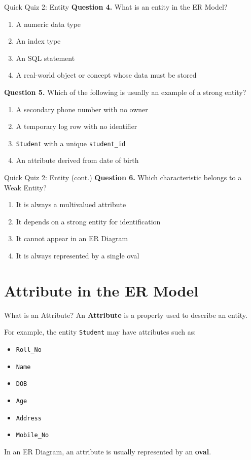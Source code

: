 \documentclass[aspectratio=169,11pt]{beamer}
\newcommand{\keyword}[1]{\textcolor{accent}{\textbf{#1}}}
\newcommand{\kw}[1]{\keyword{#1}}
\newcommand{\tightlist}{\setlength{\itemsep}{2pt}\setlength{\parskip}{0pt}}
\newcommand{\smallitem}{\setlength{\itemsep}{2pt}\setlength{\parskip}{0pt}}
\newcommand{\qoption}[2]{\item[#1.] #2}
\begin{document}
\begin{frame}{Quick Quiz 2: Entity}
\small
\textbf{Question 4.} What is an entity in the ER Model?
\begin{enumerate}
\tightlist
  \qoption{A}{A numeric data type}
  \qoption{B}{An index type}
  \qoption{C}{An SQL statement}
  \qoption{D}{A real-world object or concept whose data must be stored}
\end{enumerate}

\textbf{Question 5.} Which of the following is usually an example of a strong entity?
\begin{enumerate}
\tightlist
  \qoption{A}{A secondary phone number with no owner}
  \qoption{B}{A temporary log row with no identifier}
  \qoption{C}{\texttt{Student} with a unique \texttt{student\_id}}
  \qoption{D}{An attribute derived from date of birth}
\end{enumerate}
\end{frame}

\begin{frame}{Quick Quiz 2: Entity (cont.)}
\small
\textbf{Question 6.} Which characteristic belongs to a Weak Entity?
\begin{enumerate}
\tightlist
  \qoption{A}{It is always a multivalued attribute}
  \qoption{B}{It depends on a strong entity for identification}
  \qoption{C}{It cannot appear in an ER Diagram}
  \qoption{D}{It is always represented by a single oval}
\end{enumerate}
\end{frame}

\section{Attribute in the ER Model}

\begin{frame}{What is an Attribute?}
\small
An \kw{Attribute} is a property used to describe an entity.

\vspace{2mm}
For example, the entity \texttt{Student} may have attributes such as:
\begin{itemize}
\smallitem
  \item \texttt{Roll\_No}
  \item \texttt{Name}
  \item \texttt{DOB}
  \item \texttt{Age}
  \item \texttt{Address}
  \item \texttt{Mobile\_No}
\end{itemize}

In an ER Diagram, an attribute is usually represented by an \kw{oval}.
\end{frame}
\end{document}
